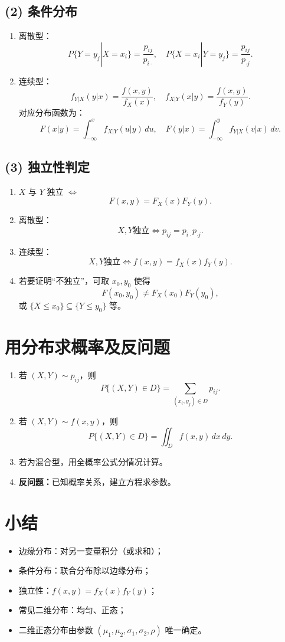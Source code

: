 \subsection*{(2) 条件分布}
\begin{enumerate}
      \item 离散型：
            $$
                  P\{Y=y_j|X=x_i\}=\frac{p_{ij}}{p_{i\cdot}},\quad
                  P\{X=x_i|Y=y_j\}=\frac{p_{ij}}{p_{\cdot j}}.
            $$
      \item 连续型：
            $$
                  f_{Y|X}(y|x)=\frac{f(x,y)}{f_X(x)}, \quad
                  f_{X|Y}(x|y)=\frac{f(x,y)}{f_Y(y)}.
            $$
            对应分布函数为：
            $$
                  F(x|y)=\int_{-\infty}^x f_{X|Y}(u|y)\,du, \quad
                  F(y|x)=\int_{-\infty}^y f_{Y|X}(v|x)\,dv.
            $$
\end{enumerate}

\subsection*{(3) 独立性判定}
\begin{enumerate}
      \item $X$ 与 $Y$ 独立 $\Leftrightarrow$
            $$
                  F(x,y)=F_X(x)F_Y(y).
            $$
      \item 离散型：
            $$
                  X,Y\text{独立} \Leftrightarrow p_{ij}=p_{i\cdot}p_{\cdot j}.
            $$
      \item 连续型：
            $$
                  X,Y\text{独立} \Leftrightarrow f(x,y)=f_X(x)f_Y(y).
            $$
      \item 若要证明“不独立”，可取 $x_0,y_0$ 使得
            $$
                  F(x_0,y_0)\ne F_X(x_0)F_Y(y_0),
            $$
            或 $\{X\le x_0\}\subseteq\{Y\le y_0\}$ 等。
\end{enumerate}


\section{用分布求概率及反问题}
\begin{enumerate}
      \item 若 $(X,Y)\sim p_{ij}$，则
            $$
                  P\{(X,Y)\in D\}=\sum_{(x_i,y_j)\in D} p_{ij}.
            $$
      \item 若 $(X,Y)\sim f(x,y)$，则
            $$
                  P\{(X,Y)\in D\}=\iint_D f(x,y)\,dx\,dy.
            $$
      \item 若为混合型，用全概率公式分情况计算。
      \item \textbf{反问题：}已知概率关系，建立方程求参数。
\end{enumerate}


\section*{小结}
\begin{itemize}
      \item 边缘分布：对另一变量积分（或求和）；
      \item 条件分布：联合分布除以边缘分布；
      \item 独立性：$f(x,y)=f_X(x)f_Y(y)$；
      \item 常见二维分布：均匀、正态；
      \item 二维正态分布由参数 $(\mu_1,\mu_2,\sigma_1,\sigma_2,\rho)$ 唯一确定。
\end{itemize}